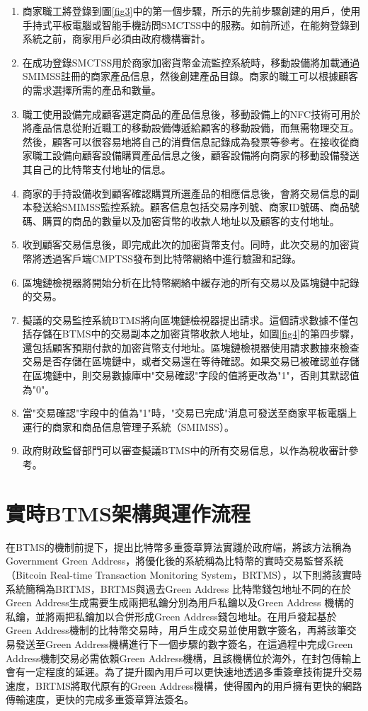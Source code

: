 		\begin{enumerate}
			\item 商家職工將登錄到圖\ref{fig3}中的第一個步驟，所示的先前步驟創建的用戶，使用手持式平板電腦或智能手機訪問SMCTSS中的服務。如前所述，在能夠登錄到系統之前，商家用戶必須由政府機構審計。
			\item 在成功登錄SMCTSS用於商家加密貨幣金流監控系統時，移動設備將加載通過SMIMSS註冊的商家產品信息，然後創建產品目錄。商家的職工可以根據顧客的需求選擇所需的產品和數量。

			\item 職工使用設備完成顧客選定商品的產品信息後，移動設備上的NFC技術可用於將產品信息從附近職工的移動設備傳遞給顧客的移動設備，而無需物理交互。然後，顧客可以很容易地將自己的消費信息記錄成為發票等參考。在接收從商家職工設備向顧客設備購買產品信息之後，顧客設備將向商家的移動設備發送其自己的比特幣支付地址的信息。
			\item 商家的手持設備收到顧客確認購買所選產品的相應信息後，會將交易信息的副本發送給SMIMSS監控系統。顧客信息包括交易序列號、商家ID號碼、商品號碼、購買的商品的數量以及加密貨幣的收款人地址以及顧客的支付地址。
			\item 收到顧客交易信息後，即完成此次的加密貨幣支付。同時，此次交易的加密貨幣將透過客戶端CMPTSS發布到比特幣網絡中進行驗證和記錄。
			\item 區塊鏈檢視器將開始分析在比特幣網絡中緩存池的所有交易以及區塊鏈中記錄的交易。
			\item 擬議的交易監控系統BTMS將向區塊鏈檢視器提出請求。這個請求數據不僅包括存儲在BTMS中的交易副本之加密貨幣收款人地址，如圖\ref{fig4}的第四步驟，還包括顧客預期付款的加密貨幣支付地址。區塊鏈檢視器使用請求數據來檢查交易是否存儲在區塊鏈中，或者交易還在等待確認。如果交易已被確認並存儲在區塊鏈中，則交易數據庫中"交易確認"字段的值將更改為"1"，否則其默認值為"0"。
			\item 當"交易確認"字段中的值為"1"時，"交易已完成"消息可發送至商家平板電腦上運行的商家和商品信息管理子系統（SMIMSS）。
			\item 政府財政監督部門可以審查擬議BTMS中的所有交易信息，以作為稅收審計參考。
		\end{enumerate}

\section{實時BTMS架構與運作流程}

		在BTMS的機制前提下，提出比特幣多重簽章算法實踐於政府端，將該方法稱為Government Green Address，將優化後的系統稱為比特幣的實時交易監督系統（Bitcoin Real-time Transaction Monitoring System，BRTMS）\supercite{tanet}，以下則將該實時系統簡稱為BRTMS，BRTMS與過去Green Address 比特幣錢包地址不同的在於Green Address生成需要生成兩把私鑰分別為用戶私鑰以及Green Address 機構的私鑰，並將兩把私鑰加以合併形成Green Address錢包地址。在用戶發起基於Green Address機制的比特幣交易時，用戶生成交易並使用數字簽名，再將該筆交易發送至Green Address機構進行下一個步驟的數字簽名，在這過程中完成Green Address機制交易必需依賴Green Address機構，且該機構位於海外，在封包傳輸上會有一定程度的延遲。為了提升國內用戶可以更快速地透過多重簽章技術提升交易速度，BRTMS將取代原有的Green Address機構，使得國內的用戶擁有更快的網路傳輸速度，更快的完成多重簽章算法簽名。 

